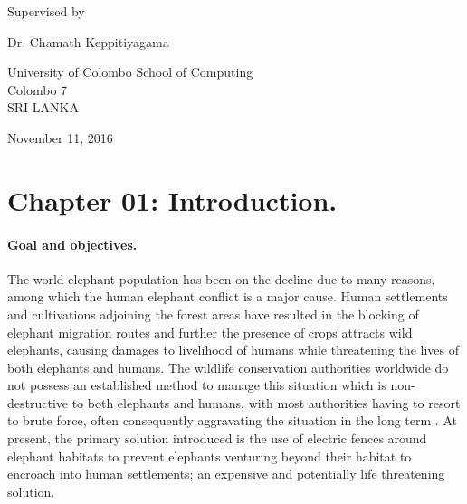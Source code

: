 \documentclass[11pt]{article}
\numberwithin{figure}{section}
\numberwithin{table}{section}
\begin{document}
\begin{titlepage}
	\vfill    
	
	{Supervised by}
	
	\vspace*{0.3\baselineskip}
	
	{\Large Dr. Chamath Keppitiyagama}
	

	
	\vspace*{0.5\baselineskip}
	
	
	
	\vfill
	
	{University of Colombo School of Computing\\
		Colombo 7\\
		SRI LANKA}
	
	\vfill
	{November 11, 2016}
	


\end{titlepage}

\newpage
\section*{Chapter 01: Introduction.}

\paragraph{Goal and objectives.}
The world elephant population has been on the decline \cite {13} due to many reasons, among which the human elephant conflict is a major cause. Human settlements and cultivations adjoining the forest areas have resulted in the blocking of elephant migration routes and further  the presence of crops attracts wild elephants, causing damages to livelihood of humans while threatening the lives of both elephants and humans. The wildlife conservation authorities worldwide do not possess an established method to manage this situation which is non-destructive to both elephants and humans, with most authorities having to resort to brute force, often consequently aggravating the situation in the long term \cite {13}. At present, the primary solution introduced is the use of electric fences around elephant habitats to prevent elephants venturing beyond their habitat to encroach into human settlements; an expensive and potentially life threatening solution. 
\end{document}
